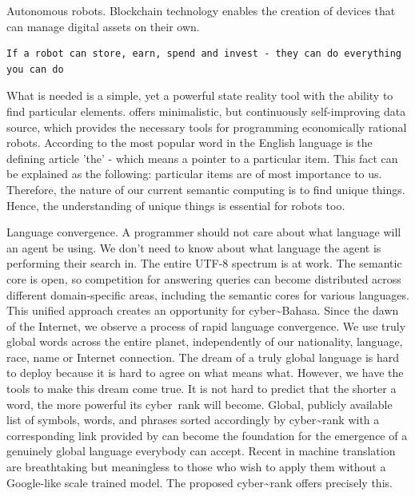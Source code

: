 \documentclass[8pt,oneside]{amsart}
\newcommand{\linkred}[2]{\href{#1}{\color{red}{#2}}}
\newcommand{\linkgreen}[2]{\href{#1}{\color{green}{#2}}}
\begin{document}
Autonomous robots. Blockchain technology enables the creation of devices that can manage digital assets on their own.

\begin{lstlisting}
If a robot can store, earn, spend and invest - they can do everything you can do
\end{lstlisting}

What is needed is a simple, yet a powerful state reality tool with the ability to find particular elements. \linkred{https://github.com/cybercongress/cyberd}{cyberd} offers minimalistic, but continuously self-improving data source, which provides the necessary tools for programming economically rational robots. According to \linkgreen{https://github.com/first20hours/google-10000-english}{top-10,000 English words} the most popular word in the English language is the defining article 'the' - which means a pointer to a particular item. This fact can be explained as the following: particular items are of most importance to us. Therefore, the nature of our current semantic computing is to find unique things. Hence, the understanding of unique things is essential for robots too.

Language convergence. A programmer should not care about what language will an agent be using. We don't need to know about what language the agent is performing their search in. The entire UTF-8 spectrum is at work. The semantic core is open, so competition for answering queries can become distributed across different domain-specific areas, including the semantic cores for various languages. This unified approach creates an opportunity for cyber\~{}Bahasa. Since the dawn of the Internet, we observe a process of rapid language convergence. We use truly global words across the entire planet, independently of our nationality, language, race, name or Internet connection. The dream of a truly global language is hard to deploy because it is hard to agree on what means what. However, we have the tools to make this dream come true. It is not hard to predict that the shorter a word, the more powerful its cyber~rank will become. Global, publicly available list of symbols, words, and phrases sorted accordingly by cyber\~{}rank with a corresponding link provided by \linkred{https://github.com/cybercongress/cyberd}{cyberd} can become the foundation for the emergence of a genuinely global language everybody can accept. Recent \linkgreen{https://ipfs.io/ipfs/QmQUWBhDMfPKgFt3NfbxM1VU22oU8CRepUzGPBDtopwap1}{scientific advances} in machine translation are breathtaking but meaningless to those who wish to apply them without a Google-like scale trained model. The proposed cyber\~{}rank offers precisely this.
\end{document}
